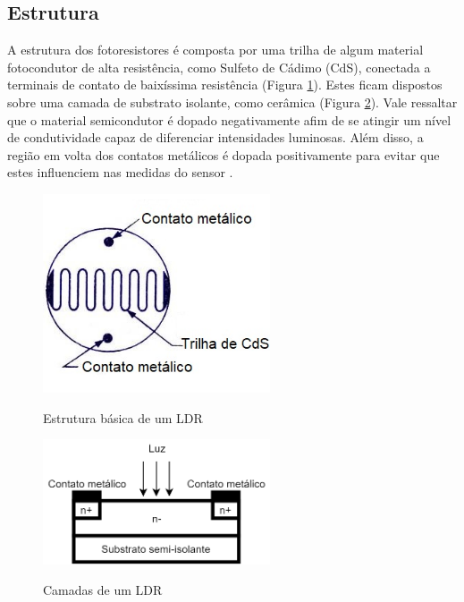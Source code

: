 \documentclass[oneside,openright,12pt]{ufsm_2015} %
\begin{document}
\subsection{Estrutura}
A estrutura dos fotoresistores é composta por uma trilha de algum material fotocondutor de alta resistência, como Sulfeto de Cádimo (CdS), conectada a terminais de contato de baixíssima resistência (Figura \ref{fig:ldrstructure}). Estes ficam dispostos sobre uma camada de substrato isolante, como cerâmica (Figura \ref{fig:substrato}). Vale ressaltar que o material semicondutor é dopado negativamente afim de se atingir um nível de condutividade capaz de diferenciar intensidades luminosas. Além disso, a região em volta dos contatos metálicos é dopada positivamente para evitar que estes influenciem nas medidas do sensor \cite{LightDep25:online}.

\begin{figure}[H]
    \caption{\label{exepretex} Estrutura básica de um LDR}
    \centering
    \includegraphics[width=0.6\textwidth]{figuras/ldrcds.jpg}
    \vspace{\baselineskip} %
        \label{fig:ldrstructure}
\end{figure}

\begin{figure}[H]
    \caption{\label{exepretex} Camadas de um LDR}
    \centering
    \includegraphics[width=0.6\textwidth]{figuras/ldr_esturtura.png}
    \vspace{\baselineskip} %
        \label{fig:substrato}
\end{figure}
\end{document}

